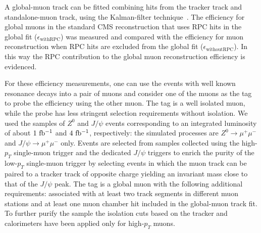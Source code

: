 \documentclass{JINST}
\begin{document}
A global-muon track can be fitted combining hits from the tracker track and standalone-muon track, using the Kalman-filter technique~\cite{Kalman}.
The efficiency for global muons in the standard CMS reconstruction that uses RPC hits in the global fit ($\epsilon_{\mathrm{withRPC}}$) was measured and compared with the efficiency for muon reconstruction when RPC hits are excluded from the global fit ($\epsilon_{\mathrm{withoutRPC}}$).
In this way the RPC contribution to the global muon reconstruction efficiency is evidenced.


For these efficiency measurements, one can use the events with well known resonance decays into a pair of muons
and consider one of the muons as the tag to probe the efficiency using the other muon.
The tag is a well isolated muon, while the probe has less stringent selection requirements without isolation. We used the samples of $Z^{0}$ and $J/\psi$ events corresponding to an integrated luminosity of about $1~\rm{fb^{-1}}$ and $4~\rm{fb^{-1}}$, respectively: the simulated processes are $Z^{0} \rightarrow \mu^+\mu^-$ and $J/\psi \rightarrow \mu^+\mu^-$ only.
Events are selected from samples collected using the high-$p_T$ single-muon trigger %
and the dedicated $J/\psi$ triggers to enrich the purity of the low-$p_T$ single-muon trigger by selecting events in which the muon track can be paired to a tracker track of opposite charge yielding an invariant mass close to that of the $J/\psi$ peak.
The tag is a global muon with the following additional requirements: associated with at least two track segments in different muon stations and at least one muon chamber hit included in the global-muon track fit. To further purify the sample the isolation cuts based on the tracker and calorimeters have been applied only for high-$p_T$ muons.
\end{document}
